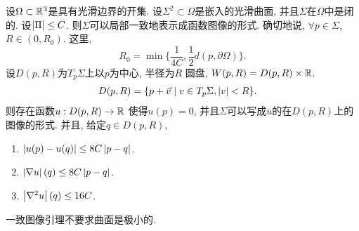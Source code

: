 \begin{lemma}[一致图像引理] \label{uniform_graph}
    设$\Omega \subset \mathbb{R}^3$是具有光滑边界的开集. 设$\Sigma^2 \subset \Omega$是嵌入的光滑曲面, 并且$\Sigma$在$\Omega$中是闭的. 设$\left | {\Pi} \right | \le C$. 则$\Sigma$可以局部一致地表示成函数图像的形式. 确切地说, $\forall p \in \Sigma$, $R\in (0,R_0)$. 这里, 
    \begin{equation}
        R_0=\min\{\frac{1}{4C}, \frac{1}{2}d(p,\partial \Omega)\}.
    \end{equation}
    设$D(p,R)$为$T_p\Sigma$上以$p$为中心, 半径为$R$ 圆盘, $W(p,R)=D(p,R)\times \mathbb{R}$. 
    \begin{align}
        &D(p,R)= \{p+\vec{v}\mid v \in T_p\Sigma, \left | v \right | < R\}. 
    \end{align}
    则存在函数$u: D(p,R)\to \mathbb{R}$ 使得$u(p)=0$, 并且$\Sigma$可以写成$u$的在$D(p,R)$上的图像的形式. 并且, 给定$q \in D(p,R)$,
    \begin{enumerate}
        \item $\left | u(p)-u(q) \right | \le 8C\left | p-q \right |$.
        \item $\left | \nabla u \right |(q) \le 8C\left | p-q \right |$.
        \item $\left | \nabla^2 u \right |(q) \le 16C$.
    \end{enumerate}
\end{lemma}
\begin{remark}
    一致图像引理不要求曲面是极小的.
\end{remark}
